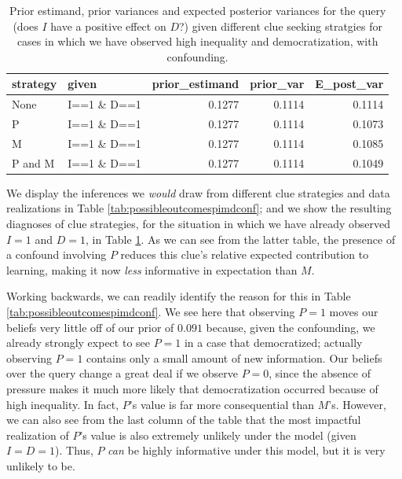 \documentclass[
  12pt,
]{book}
\begin{document}
\begin{table}

\caption{\label{tab:pimdlearni1d1con}Prior estimand, prior variances and expected posterior variances for the query (does $I$ have a positive effect on $D$?) given different  clue seeking  stratgies for cases in which we have observed high inequality and democratization, with confounding.}
\centering
\begin{tabular}[t]{l|l|r|r|r}
\hline
strategy & given & prior\_estimand & prior\_var & E\_post\_var\\
\hline
None & I==1 \& D==1 & 0.1277 & 0.1114 & 0.1114\\
\hline
P & I==1 \& D==1 & 0.1277 & 0.1114 & 0.1073\\
\hline
M & I==1 \& D==1 & 0.1277 & 0.1114 & 0.1085\\
\hline
P and M & I==1 \& D==1 & 0.1277 & 0.1114 & 0.1049\\
\hline
\end{tabular}
\end{table}

We display the inferences we \emph{would} draw from different clue strategies and data realizations in Table \ref{tab:possibleoutcomespimdconf}; and we show the resulting diagnoses of clue strategies, for the situation in which we have already observed \(I=1\) and \(D=1\), in Table \ref{tab:pimdlearni1d1con}. As we can see from the latter table, the presence of a confound involving \(P\) reduces this clue's relative expected contribution to learning, making it now \emph{less} informative in expectation than \(M\).

Working backwards, we can readily identify the reason for this in Table \ref{tab:possibleoutcomespimdconf}. We see here that observing \(P=1\) moves our beliefs very little off of our prior of \(0.091\) because, given the confounding, we already strongly expect to see \(P=1\) in a case that democratized; actually observing \(P=1\) contains only a small amount of new information. Our beliefs over the query change a great deal if we observe \(P=0\), since the absence of pressure makes it much more likely that democratization occurred because of high inequality. In fact, \(P\)'s value is far more consequential than \(M\)'s. However, we can also see from the last column of the table that the most impactful realization of \(P\)'s value is also extremely unlikely under the model (given \(I=D=1\)). Thus, \(P\) \emph{can} be highly informative under this model, but it is very unlikely to be.
\end{document}
